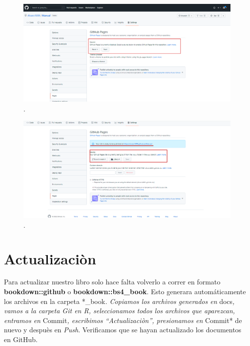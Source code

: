 \documentclass[
  11pt,
  spanish,
  oneside]{book}
\begin{document}
\begin{figure}

{\centering \includegraphics[width=0.7\linewidth]{imagenes/Imagen 15} 

}

\caption{.}\label{fig:unnamed-chunk-15}
\end{figure}

\begin{figure}

{\centering \includegraphics[width=0.7\linewidth]{imagenes/Imagen 16} 

}

\caption{.}\label{fig:unnamed-chunk-16}
\end{figure}

\hypertarget{actualizaciuxf2n}{%
\chapter*{Actualizaciòn}\label{actualizaciuxf2n}}

Para actualizar nuestro libro solo hace falta volverlo a correr en formato \textbf{bookdown::github} o \textbf{bookdown::bs4\_book}. Esto generara automáticamente los archivos en la carpeta *\_book\emph{. Copiamos los archivos generados en }docs\emph{, vamos a la carpeta Git en R, seleccionamos todos los archivos que aparezcan, entramos en }Commit\emph{, escribimos ``Actualizaciòn'', presionamos en }Commit* de nuevo y despuès en \emph{Push}. Verificamos que se hayan actualizado los documentos en GitHub.

  
\end{document}
